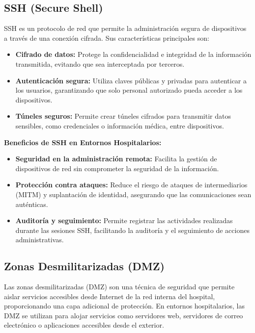 \subsection{SSH (Secure Shell)}
\label{subsec:ssh}
SSH es un protocolo de red que permite la administración segura de dispositivos a través de una conexión cifrada. Sus características principales son:
\begin{itemize}
    \item \textbf{Cifrado de datos:} Protege la confidencialidad e integridad de la información transmitida, evitando que sea interceptada por terceros.
    \item \textbf{Autenticación segura:} Utiliza claves públicas y privadas para autenticar a los usuarios, garantizando que solo personal autorizado pueda acceder a los dispositivos.
    \item \textbf{Túneles seguros:} Permite crear túneles cifrados para transmitir datos sensibles, como credenciales o información médica, entre dispositivos.
\end{itemize}
\textbf{Beneficios de SSH en Entornos Hospitalarios:}
\begin{itemize}
    \item \textbf{Seguridad en la administración remota:} Facilita la gestión de dispositivos de red sin comprometer la seguridad de la información.
    \item \textbf{Protección contra ataques:} Reduce el riesgo de ataques de intermediarios (MITM) y suplantación de identidad, asegurando que las comunicaciones sean auténticas.
    \item \textbf{Auditoría y seguimiento:} Permite registrar las actividades realizadas durante las sesiones SSH, facilitando la auditoría y el seguimiento de acciones administrativas.
\end{itemize}

\subsection{Zonas Desmilitarizadas (DMZ)}
Las zonas desmilitarizadas (DMZ) son una técnica de seguridad que permite aislar servicios accesibles desde Internet de la red interna del hospital, proporcionando una capa adicional de protección.
En entornos hospitalarios, las DMZ se utilizan para alojar servicios como servidores web, servidores de correo electrónico o aplicaciones accesibles desde el exterior.

